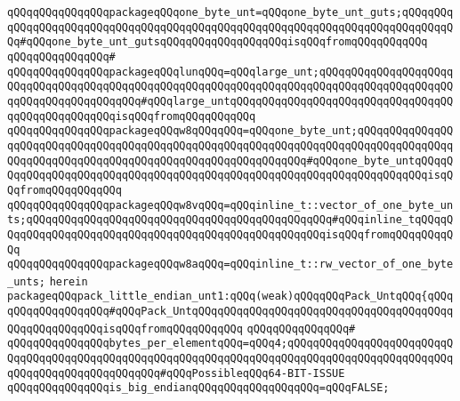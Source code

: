 \verb|qQQqqQQqqQQqqQQqpackageqQQqone_byte_unt=qQQqone_byte_unt_guts;qQQqqQQqqQQqqQQqqQQqqQQqqQQqqQQqqQQqqQQqqQQqqQQqqQQqqQQqqQQqqQQqqQQqqQQqqQQqqQQq#qQQqone_byte_unt_gutsqQQqqQQqqQQqqQQqqQQqisqQQqfromqQQqqQQqqQQq|\newline
\verb|qQQqqQQqqQQqqQQq#|\newline
\verb|qQQqqQQqqQQqqQQqpackageqQQqlunqQQq=qQQqlarge_unt;qQQqqQQqqQQqqQQqqQQqqQQqqQQqqQQqqQQqqQQqqQQqqQQqqQQqqQQqqQQqqQQqqQQqqQQqqQQqqQQqqQQqqQQqqQQqqQQqqQQqqQQqqQQqqQQq#qQQqlarge_untqQQqqQQqqQQqqQQqqQQqqQQqqQQqqQQqqQQqqQQqqQQqqQQqqQQqisqQQqfromqQQqqQQqqQQq|\newline
\verb|qQQqqQQqqQQqqQQqpackageqQQqw8qQQqqQQq=qQQqone_byte_unt;qQQqqQQqqQQqqQQqqQQqqQQqqQQqqQQqqQQqqQQqqQQqqQQqqQQqqQQqqQQqqQQqqQQqqQQqqQQqqQQqqQQqqQQqqQQqqQQqqQQqqQQqqQQqqQQqqQQqqQQqqQQqqQQqqQQq#qQQqone_byte_untqQQqqQQqqQQqqQQqqQQqqQQqqQQqqQQqqQQqqQQqqQQqqQQqqQQqqQQqqQQqqQQqqQQqqQQqisqQQqfromqQQqqQQqqQQq|\newline
\verb|qQQqqQQqqQQqqQQqpackageqQQqw8vqQQq=qQQqinline_t::vector_of_one_byte_unts;qQQqqQQqqQQqqQQqqQQqqQQqqQQqqQQqqQQqqQQqqQQqqQQq#qQQqinline_tqQQqqQQqqQQqqQQqqQQqqQQqqQQqqQQqqQQqqQQqqQQqqQQqqQQqqQQqisqQQqfromqQQqqQQqqQQq|\newline
\verb|qQQqqQQqqQQqqQQqpackageqQQqw8aqQQq=qQQqinline_t::rw_vector_of_one_byte_unts;|\newline
\verb|herein|\newline
\newline
\verb|packageqQQqpack_little_endian_unt1:qQQq(weak)qQQqqQQqPack_UntqQQq{qQQqqQQqqQQqqQQqqQQq#qQQqPack_UntqQQqqQQqqQQqqQQqqQQqqQQqqQQqqQQqqQQqqQQqqQQqqQQqqQQqqQQqisqQQqfromqQQqqQQqqQQq|\newline
\verb|qQQqqQQqqQQqqQQq#|\newline
\newline
\verb|qQQqqQQqqQQqqQQqbytes_per_elementqQQq=qQQq4;qQQqqQQqqQQqqQQqqQQqqQQqqQQqqQQqqQQqqQQqqQQqqQQqqQQqqQQqqQQqqQQqqQQqqQQqqQQqqQQqqQQqqQQqqQQqqQQqqQQqqQQqqQQqqQQqqQQqqQQq#qQQqPossibleqQQq64-BIT-ISSUE|\newline
\verb|qQQqqQQqqQQqqQQqis_big_endianqQQqqQQqqQQqqQQqqQQq=qQQqFALSE;|\newline
